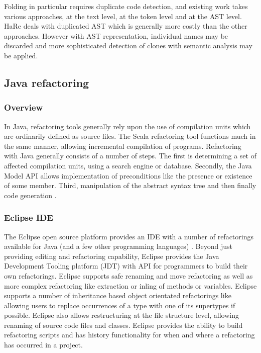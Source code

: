 Folding in particular requires duplicate code detection, and existing work takes various approaches, at the text level, at the token level and at the AST level. HaRe deals with duplicated AST which is generally more costly than the other approaches. However with AST representation, individual names may be discarded and more sophisticated detection of clones with semantic analysis may be applied. 

\subsection{Java refactoring}
\subsubsection{Overview}
In Java, refactoring tools generally rely upon the use of compilation units which are ordinarily defined as source files. The Scala refactoring tool functions much in the same manner, allowing incremental compilation of programs. Refactoring with Java generally consists of a number of steps. The first is determining a set of affected compilation units, using a search engine or database. Secondly, the Java Model API allows implementation of preconditions like the presence or existence of some member. Third, manipulation of the abstract syntax tree and then finally code generation \cite{baumer2001integrating}. 

\subsubsection{Eclipse IDE}
The Eclipse open source platform provides an IDE with a number of refactorings available for Java (and a few other programming languages) \cite{widmer07}. Beyond just providing editing and refactoring capability, Eclipse provides the Java Development Tooling platform (JDT) with API for programmers to build their own refactorings. Eclipse supports safe renaming and move refactoring as well as more complex refactoring like extraction or inling of methods or variables. Eclipse supports a number of inheritance based object orientated refactorings like allowing users to replace occurrences of a type with one of its supertypes if possible. Eclipse also allows restructuring at the file structure level, allowing renaming of source code files and classes. Eclipse provides the ability to build refactoring scripts and has history functionality for when and where a refactoring has occurred in a project. 

